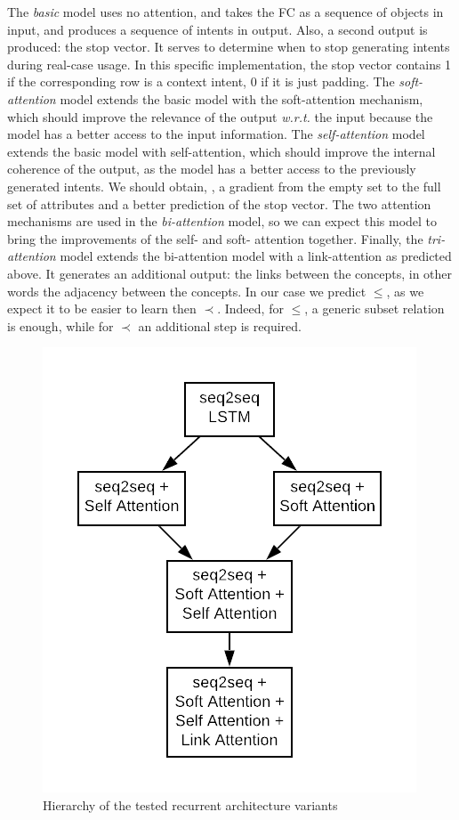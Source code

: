 The \textit{basic} model uses no attention, and takes the FC as a sequence of objects in input, and produces a sequence of intents in output.
Also, a second output is produced: the stop vector. It serves to determine when to stop generating intents during real-case usage.
In this specific implementation, the stop vector contains 1 if the corresponding row is a context intent, 0 if it is just padding.
%
The \textit{soft-attention} model extends the basic model with the soft-attention mechanism, which should improve the relevance of the output \textit{w.r.t.} the input because the model has a better access to the input information.
%
The \textit{self-attention} model extends the basic model with self-attention, which should improve the internal coherence of the output, as the model has a better access to the previously generated intents. We should obtain, \eg, a gradient from the empty set to the full set of attributes and a better prediction of the stop vector.
%
The two attention mechanisms are used in the \textit{bi-attention} model, so we can expect this model to bring the improvements of the self- and soft- attention together.
%
Finally, the \textit{tri-attention} model extends the bi-attention model with a link-attention as predicted above.
It generates an additional output: the links between the concepts, in other words the adjacency between the concepts. In our case we predict $\leq$, as we expect it to be easier to learn then $\prec$. Indeed, for $\leq$, a generic subset relation is enough, while for $\prec$ an additional step is required.

\begin{figure}
    \centering
    \includegraphics[width = .8\textwidth, height = .4\textwidth, keepaspectratio]{Figures/Ch3/rnn_attention.png}
    \caption{Hierarchy of the tested recurrent architecture variants}
    \label{fig:rnn_variants}
\end{figure}

